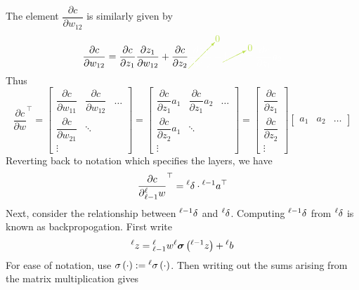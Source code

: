 \documentclass[11pt]{report} %
\begin{document}
The element $\dfrac{\partial c}{\partial w_{12}}$ is similarly given by
\begin{equation}
\dfrac{\partial c}{\partial w_{12}}=\dfrac{\partial c}{\partial z_{1}}\dfrac{\partial z_{1}}{\partial w_{12}}+\dfrac{\partial c}{\partial z_{2}}\green\cancelto{0}{\black\dfrac{\partial z_{2}}{\partial w_{12}}}\black+\green\cancelto{0}{\black\left[\dots\right]}\black=\dfrac{\partial c}{\partial z_{1}}a_{2}
\end{equation}
Thus
\begin{equation}
\dfrac{\partial c}{\partial w}^{\top}=\begin{bmatrix}\dfrac{\partial c}{\partial w_{11}} & \dfrac{\partial c}{\partial w_{12}} & \dots\\
\dfrac{\partial c}{\partial w_{21}} & \ddots\\
\vdots
\end{bmatrix}=\begin{bmatrix}\dfrac{\partial c}{\partial z_{1}}a_{1} & \dfrac{\partial c}{\partial z_{1}}a_{2} & \dots\\
\dfrac{\partial c}{\partial z_{2}}a_{1} & \ddots\\
\vdots
\end{bmatrix}=\begin{bmatrix}\dfrac{\partial c}{\partial z_{1}}\\
\dfrac{\partial c}{\partial z_{2}}\\
\vdots
\end{bmatrix}\begin{bmatrix}a_{1} & a_{2} & \dots\end{bmatrix}
\end{equation}
Reverting back to notation which specifies the layers, we have
\begin{equation}
\dfrac{\partial c}{\partial\mathstrut_{\ell-1}^{\ell}w}^{\top}=\mathstrut^{\ell}\delta\cdot\mathstrut^{\ell-1}a^{\top}
\end{equation}
Next, consider the relationship between $\mathstrut^{\ell - 1}\delta$ and $\mathstrut^{\ell}\delta$. Computing $\mathstrut^{\ell - 1}\delta$ from $\mathstrut^{\ell}\delta$ is known as backpropogation. First write
\begin{equation}
\mathstrut^{\ell}z=\mathstrut_{\ell-1}^{\ell}w\mathstrut^{\ell}\boldsymbol{\sigma}\left(\mathstrut^{\ell-1}z\right)+\mathstrut^{\ell}b
\end{equation}
For ease of notation, use $\sigma\left(\cdot\right):=\mathstrut^{\ell}\sigma\left(\cdot\right)$. Then writing out the sums arising from the matrix multiplication gives
\end{document}
